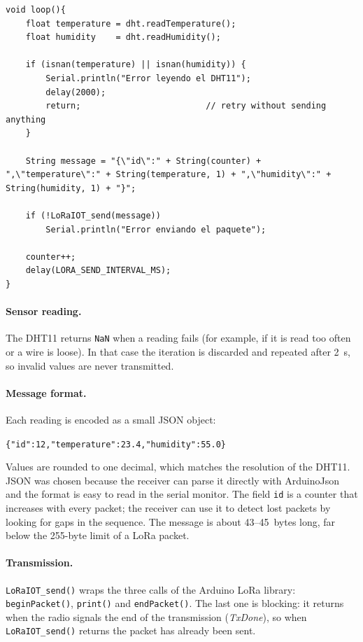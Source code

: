 \documentclass[informe,english]{plantilla}
\begin{document}
\begin{lstlisting}[style=arduino, caption={Main loop of the transmitter.}]
void loop(){
    float temperature = dht.readTemperature();
    float humidity    = dht.readHumidity();

    if (isnan(temperature) || isnan(humidity)) {
        Serial.println("Error leyendo el DHT11");
        delay(2000);
        return;                         // retry without sending anything
    }

    String message = "{\"id\":" + String(counter) + ",\"temperature\":" + String(temperature, 1) + ",\"humidity\":" + String(humidity, 1) + "}";

    if (!LoRaIOT_send(message))
        Serial.println("Error enviando el paquete");

    counter++;
    delay(LORA_SEND_INTERVAL_MS);
}
\end{lstlisting}

\paragraph{Sensor reading.} The DHT11 returns \texttt{NaN} when a reading fails (for example, if it is read too often or a wire is loose). In that case the iteration is discarded and repeated after 2~s, so invalid values are never transmitted.

\paragraph{Message format.} Each reading is encoded as a small JSON object:
\begin{center}
    \texttt{\{"id":12,"temperature":23.4,"humidity":55.0\}}
\end{center}
Values are rounded to one decimal, which matches the resolution of the DHT11. JSON was chosen because the receiver can parse it directly with ArduinoJson and the format is easy to read in the serial monitor. The field \texttt{id} is a counter that increases with every packet; the receiver can use it to detect lost packets by looking for gaps in the sequence. The message is about 43--45~bytes long, far below the 255-byte limit of a LoRa packet.

\paragraph{Transmission.} \texttt{LoRaIOT\_send()} wraps the three calls of the Arduino LoRa library: \texttt{beginPacket()}, \texttt{print()} and \texttt{endPacket()}. The last one is blocking: it returns when the radio signals the end of the transmission (\emph{TxDone}), so when \texttt{LoRaIOT\_send()} returns the packet has already been sent.
\end{document}

